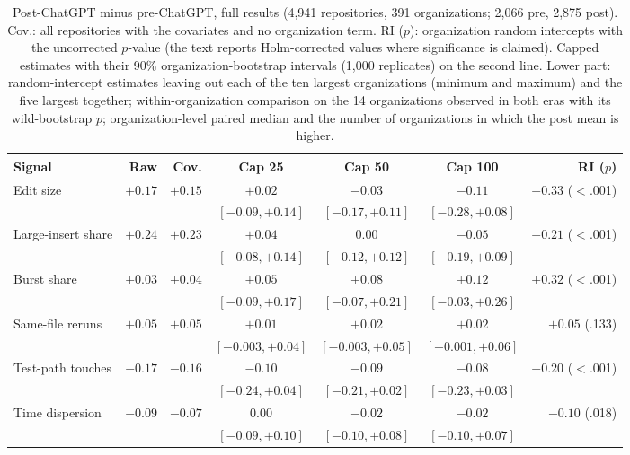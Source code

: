 \begin{table}[!htbp]
\caption{Post-ChatGPT minus pre-ChatGPT, full results (4,941 repositories, 391 organizations; 2,066 pre, 2,875 post). Cov.: all repositories with the covariates and no organization term. RI ($p$): organization random intercepts with the uncorrected $p$-value (the text reports Holm-corrected values where significance is claimed). Capped estimates with their 90\% organization-bootstrap intervals (1,000 replicates) on the second line. Lower part: random-intercept estimates leaving out each of the ten largest organizations (minimum and maximum) and the five largest together; within-organization comparison on the 14 organizations observed in both eras with its wild-bootstrap $p$; organization-level paired median and the number of organizations in which the post mean is higher.}
\label{tab:era}
\scriptsize
\setlength{\tabcolsep}{2.5pt}
\begin{tabular}{@{}l r r c c c r@{}}
\toprule
Signal & Raw & Cov. & Cap 25 & Cap 50 & Cap 100 & RI ($p$) \\
\midrule
Edit size & $+0.17$ & $+0.15$ & $+0.02$ & $-0.03$ & $-0.11$ & $-0.33$ ($<$.001) \\
 & & & $[-0.09, +0.14]$ & $[-0.17, +0.11]$ & $[-0.28, +0.08]$ & \\[2pt]
Large-insert share & $+0.24$ & $+0.23$ & $+0.04$ & $0.00$ & $-0.05$ & $-0.21$ ($<$.001) \\
 & & & $[-0.08, +0.14]$ & $[-0.12, +0.12]$ & $[-0.19, +0.09]$ & \\[2pt]
Burst share & $+0.03$ & $+0.04$ & $+0.05$ & $+0.08$ & $+0.12$ & $+0.32$ ($<$.001) \\
 & & & $[-0.09, +0.17]$ & $[-0.07, +0.21]$ & $[-0.03, +0.26]$ & \\[2pt]
Same-file reruns & $+0.05$ & $+0.05$ & $+0.01$ & $+0.02$ & $+0.02$ & $+0.05$ (.133) \\
 & & & $[-0.003, +0.04]$ & $[-0.003, +0.05]$ & $[-0.001, +0.06]$ & \\[2pt]
Test-path touches & $-0.17$ & $-0.16$ & $-0.10$ & $-0.09$ & $-0.08$ & $-0.20$ ($<$.001) \\
 & & & $[-0.24, +0.04]$ & $[-0.21, +0.02]$ & $[-0.23, +0.03]$ & \\[2pt]
Time dispersion & $-0.09$ & $-0.07$ & $0.00$ & $-0.02$ & $-0.02$ & $-0.10$ (.018) \\
 & & & $[-0.09, +0.10]$ & $[-0.10, +0.08]$ & $[-0.10, +0.07]$ & \\[2pt]
\bottomrule
\end{tabular}


\end{table}
